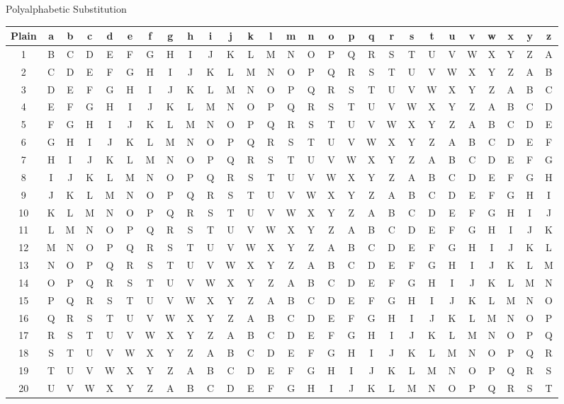 \documentclass[]{beamer}
\begin{document}
\begin{frame}{Polyalphabetic Substitution}
	\begin{table}
		\centering
		\resizebox{10.5cm}{!} {
			\begin{tabular}{c c c c c c c c c c c c c c c c c c c c c c c c c c c}
				\hline
				Plain & a & \textcolor{focus}{b} & c & d & e & f & g & h & i & j & k & \textcolor{focus}{l} & m & n & \textcolor{focus}{o} & p & q & r & s & t & u & v & w & x & y & z\\
				\hline
				1 &B&C&D&E&F&G&H&I&J&K&L&M&N&O&P&Q&R&S&T&U&V&W&X&Y&Z&A \\
				\rowcolor{highlight}2 &\textcolor{focus}{C}&D&E&F&G&H&I&J&K&L&M&N&O&P&Q&R&S&T&U&V&W&X&Y&Z&A&B \\ 
				3 &D&E&F&G&H&I&J&K&L&M&N&O&P&Q&R&S&T&U&V&W&X&Y&Z&A&B&C \\
				4 &E&F&G&H&I&J&K&L&M&N&O&P&Q&R&S&T&U&V&W&X&Y&Z&A&B&C&D \\
				\rowcolor{highlight}5 &\textcolor{focus}{F}&G&H&I&J&K&L&M&N&O&P&Q&R&S&T&U&V&W&X&Y&Z&A&B&C&D&E \\ 
				6 &G&H&I&J&K&L&M&N&O&P&Q&R&S&T&U&V&W&X&Y&Z&A&B&C&D&E&F \\
				7 &H&I&J&K&L&M&N&O&P&Q&R&S&T&U&V&W&X&Y&Z&A&B&C&D&E&F&G \\
				\rowcolor{highlight}8 &\textcolor{focus}{I}&J&K&L&M&N&O&P&Q&R&S&T&U&V&W&X&Y&Z&A&B&C&D&E&F&G&H \\
				9 &J&K&L&M&N&O&P&Q&R&S&T&U&V&W&X&Y&Z&A&B&C&D&E&F&G&H&I \\
				10 &K&L&M&N&O&P&Q&R&S&T&U&V&W&X&Y&Z&A&B&C&D&E&F&G&H&I&J \\
				11 &L&M&N&O&P&Q&R&S&T&U&V&W&X&Y&Z&A&B&C&D&E&F&G&H&I&J&K \\
				12 &M&N&O&P&Q&R&S&T&U&V&W&X&Y&Z&A&B&C&D&E&F&G&H&I&J&K&L \\
				13 &N&O&P&Q&R&S&T&U&V&W&X&Y&Z&A&B&C&D&E&F&G&H&I&J&K&L&M \\
				14 &O&P&Q&R&S&T&U&V&W&X&Y&Z&A&B&C&D&E&F&G&H&I&J&K&L&M&N \\
				15 &P&Q&R&S&T&U&V&W&X&Y&Z&A&B&C&D&E&F&G&H&I&J&K&L&M&N&O \\
				16 &Q&R&S&T&U&V&W&X&Y&Z&A&B&C&D&E&F&G&H&I&J&K&L&M&N&O&P \\
				17 &R&S&T&U&V&W&X&Y&Z&A&B&C&D&E&F&G&H&I&J&K&L&M&N&O&P&Q \\
				18 &S&T&U&V&W&X&Y&Z&A&B&C&D&E&F&G&H&I&J&K&L&M&N&O&P&Q&R \\
				19 &T&U&V&W&X&Y&Z&A&B&C&D&E&F&G&H&I&J&K&L&M&N&O&P&Q&R&S \\
				20 &U&V&W&X&Y&Z&A&B&C&D&E&F&G&H&I&J&K&L&M&N&O&P&Q&R&S&T \\

\end{tabular}}
\end{table}
\end{frame}
\end{document}
